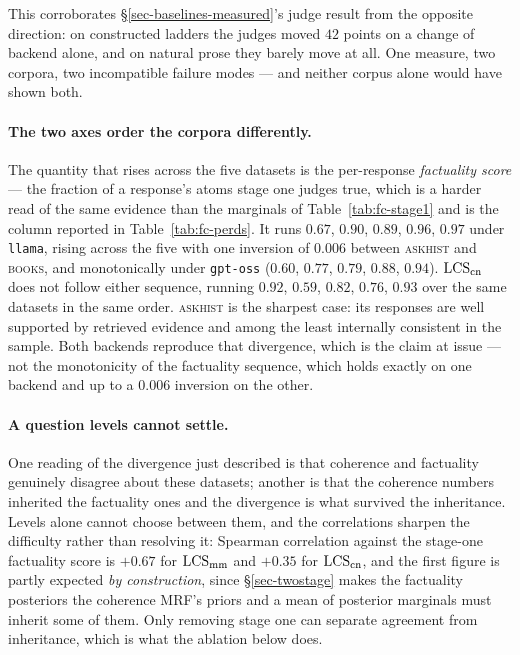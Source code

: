 This corroborates \S\ref{sec-baselines-measured}'s judge result from the opposite direction: on
constructed ladders the judges moved $42$ points on a change of backend alone, and on natural prose
they barely move at all. One measure, two corpora, two incompatible failure modes --- and neither
corpus alone would have shown both.

\paragraph{The two axes order the corpora differently.} The quantity that rises across the five datasets
is the per-response \emph{factuality score} --- the fraction of a response's atoms stage one judges true,
which is a harder read of the same evidence than the marginals of Table~\ref{tab:fc-stage1} and is the
column reported in Table~\ref{tab:fc-perds}. It runs $0.67$, $0.90$, $0.89$, $0.96$, $0.97$ under
\texttt{llama}, rising across the five with one inversion of $0.006$ between \textsc{askhist} and
\textsc{books}, and monotonically under \texttt{gpt-oss} ($0.60$, $0.77$, $0.79$, $0.88$, $0.94$).
$\mathrm{LCS}_{\mathrm{cn}}$ does not follow either sequence, running $0.92$, $0.59$, $0.82$, $0.76$, $0.93$ over the
same datasets in the same order. \textsc{askhist} is the sharpest case: its responses are well supported
by retrieved evidence and among the least internally consistent in the sample. Both backends reproduce
that divergence, which is the claim at issue --- not the monotonicity of the factuality sequence, which
holds exactly on one backend and up to a $0.006$ inversion on the other.

\paragraph{A question levels cannot settle.} One reading of the divergence just described is that
coherence and factuality genuinely disagree about these datasets; another is that the coherence numbers
inherited the factuality ones and the divergence is what survived the inheritance. Levels alone cannot
choose between them, and the correlations sharpen the difficulty rather than resolving it: Spearman
correlation against the stage-one factuality score is $+0.67$ for $\mathrm{LCS}_{\mathrm{mm}}$ and $+0.35$ for
$\mathrm{LCS}_{\mathrm{cn}}$, and the first figure is partly expected \emph{by construction}, since
\S\ref{sec-twostage} makes the factuality posteriors the coherence MRF's priors and a mean of posterior
marginals must inherit some of them. Only removing stage one can separate agreement from inheritance,
which is what the ablation below does.

